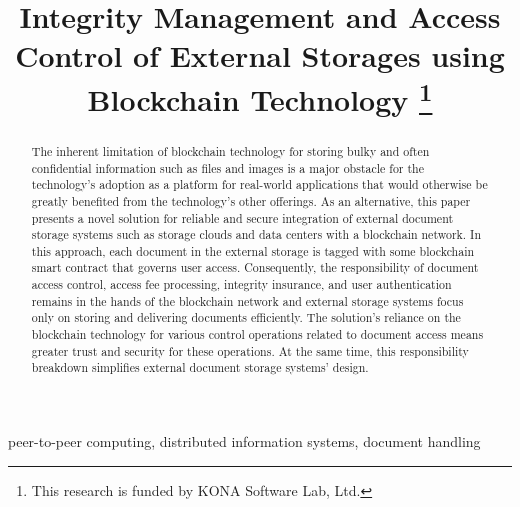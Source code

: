 \documentclass[conference]{IEEEtran}
\begin{document}
\title{Integrity Management and Access Control of External Storages using Blockchain Technology 
	\thanks{This research is funded by KONA Software Lab, Ltd.}
}

\author{
	\and
}
\maketitle

\begin{abstract}
The inherent limitation of blockchain technology for storing bulky and often confidential information such as files and images is a major obstacle for the technology's adoption as a platform for real-world applications that would otherwise be greatly benefited from the technology's other offerings. As an alternative, this paper presents a novel solution for reliable and secure integration of external document storage systems such as storage clouds and data centers with a blockchain network. In this approach, each document in the external storage is tagged with some blockchain smart contract that governs user access. Consequently, the responsibility of document access control, access fee processing, integrity insurance, and user authentication remains in the hands of the blockchain network and external storage systems focus only on storing and delivering documents efficiently. The solution's reliance on the blockchain technology for various control operations related to document access means greater trust and security for these operations. At the same time, this responsibility breakdown simplifies external document storage systems' design.    
\end{abstract}

\begin{IEEEkeywords}
peer-to-peer computing, distributed information systems, document handling  
\end{IEEEkeywords}








             

       



 


\end{document}
